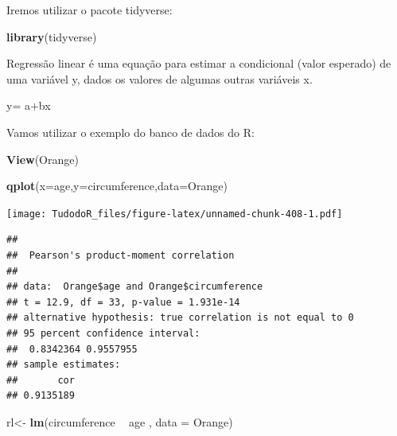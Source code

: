 \documentclass[
]{book}
\newenvironment{Shaded}{\begin{snugshade}}{\end{snugshade}}
\newcommand{\DataTypeTok}[1]{\textcolor[rgb]{0.13,0.29,0.53}{#1}}
\newcommand{\KeywordTok}[1]{\textcolor[rgb]{0.13,0.29,0.53}{\textbf{#1}}}
\newcommand{\NormalTok}[1]{#1}
\newcommand{\OperatorTok}[1]{\textcolor[rgb]{0.81,0.36,0.00}{\textbf{#1}}}
\newcommand{\StringTok}[1]{\textcolor[rgb]{0.31,0.60,0.02}{#1}}
\begin{document}
Iremos utilizar o pacote tidyverse:

\begin{Shaded}
\begin{Highlighting}[]
\KeywordTok{library}\NormalTok{(tidyverse)}
\end{Highlighting}
\end{Shaded}

Regressão linear é uma equação para estimar a condicional (valor esperado) de
uma variável y, dados os valores de algumas outras variáveis x.

y= a+bx

Vamos utilizar o exemplo do banco de dados do R:

\begin{Shaded}
\begin{Highlighting}[]
\KeywordTok{View}\NormalTok{(Orange)}
\end{Highlighting}
\end{Shaded}

\begin{Shaded}
\begin{Highlighting}[]
\KeywordTok{qplot}\NormalTok{(}\DataTypeTok{x=}\NormalTok{age,}\DataTypeTok{y=}\NormalTok{circumference,}\DataTypeTok{data=}\NormalTok{Orange)}
\end{Highlighting}
\end{Shaded}

\texttt{[image: TudodoR\_files/figure-latex/unnamed-chunk-408-1.pdf]}

\begin{Shaded}
\end{Shaded}

\begin{verbatim}
## 
##  Pearson's product-moment correlation
## 
## data:  Orange$age and Orange$circumference
## t = 12.9, df = 33, p-value = 1.931e-14
## alternative hypothesis: true correlation is not equal to 0
## 95 percent confidence interval:
##  0.8342364 0.9557955
## sample estimates:
##       cor 
## 0.9135189
\end{verbatim}

\begin{Shaded}
\begin{Highlighting}[]
\NormalTok{rl<-}\StringTok{ }\KeywordTok{lm}\NormalTok{(circumference }\OperatorTok{~}\StringTok{ }\NormalTok{age , }\DataTypeTok{data =}\NormalTok{ Orange)}
\end{Highlighting}
\end{Shaded}
\end{document}
